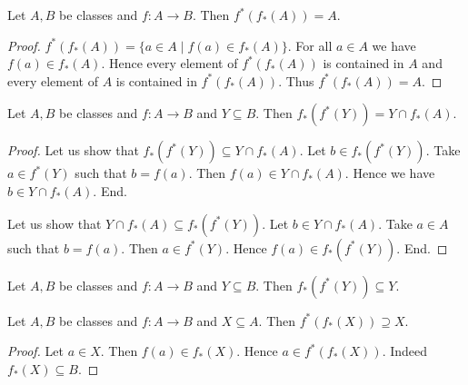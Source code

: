 \documentclass[10pt]{article}
\begin{document}
  \begin{forthel}
    \begin{proposition}[id=FOUNDATIONS_07_3819758101200896,printid]
      Let $A, B$ be classes and $f : A \to B$.
      Then $f^{*}(f_{*}(A)) = A$.
    \end{proposition}
    \begin{proof}
      $f^{*}(f_{*}(A)) = \{ a \in A \mid f(a) \in f_{*}(A) \}$.
      For all $a \in A$ we have $f(a) \in f_{*}(A)$.
      Hence every element of $f^{*}(f_{*}(A))$ is contained in $A$ and every element of $A$ is contained in $f^{*}(f_{*}(A))$.
      Thus $f^{*}(f_{*}(A)) = A$.
    \end{proof}
  \end{forthel}

  \begin{forthel}
    \begin{proposition}[id=FOUNDATIONS_07_7760514696347648,printid]
      Let $A, B$ be classes and $f : A \to B$ and $Y \subseteq B$.
      Then $f_{*}(f^{*}(Y)) = Y \cap f_{*}(A)$.
    \end{proposition}
    \begin{proof}
      Let us show that $f_{*}(f^{*}(Y)) \subseteq Y \cap f_{*}(A)$.
        Let $b \in f_{*}(f^{*}(Y))$.
        Take $a \in f^{*}(Y)$ such that $b = f(a)$.
        Then $f(a) \in Y \cap f_{*}(A)$.
        Hence we have $b \in Y \cap f_{*}(A)$.
      End.

      Let us show that $Y \cap f_{*}(A) \subseteq f_{*}(f^{*}(Y))$.
        Let $b \in Y \cap f_{*}(A)$.
        Take $a \in A$ such that $b = f(a)$.
        Then $a \in f^{*}(Y)$.
        Hence $f(a) \in f_{*}(f^{*}(Y))$.
      End.
    \end{proof}
  \end{forthel}

  \begin{forthel}
    \begin{corollary}[id=FOUNDATIONS_07_5585105345052672,printid]
      Let $A, B$ be classes and $f : A \to B$ and $Y \subseteq B$.
      Then $f_{*}(f^{*}(Y)) \subseteq Y$.
    \end{corollary}
  \end{forthel}

  \begin{forthel}
    \begin{proposition}[id=FOUNDATIONS_07_4890896170483712,printid]
      Let $A, B$ be classes and $f : A \to B$ and $X \subseteq A$.
      Then $f^{*}(f_{*}(X)) \supseteq X$.
    \end{proposition}
    \begin{proof}
      Let $a \in X$.
      Then $f(a) \in f_{*}(X)$.
      Hence $a \in f^{*}(f_{*}(X))$.
      Indeed $f_{*}(X) \subseteq B$.
    \end{proof}
  \end{forthel}
\end{document}
